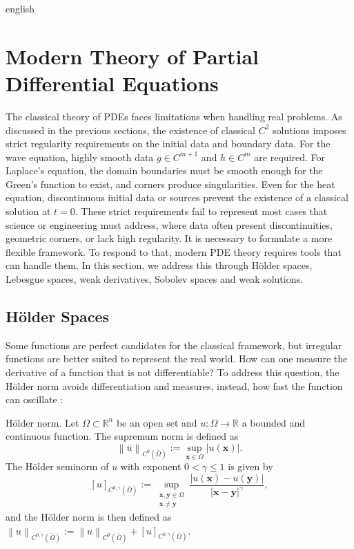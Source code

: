 \documentclass[11pt,letterpaper,twoside,openright]{book} %
\newcommand{\norm}[1]{\left\lVert #1 \right\rVert}
\newcommand{\abs}[1]{\left\lvert #1 \right\rvert}
\begin{document}
\begin{hyphenrules}{english}
\section{Modern Theory of Partial Differential Equations}\label{sec:modern-theory}

The classical theory of PDEs faces limitations when handling real problems. As discussed in the
previous sections, the existence of classical $C^2$ solutions imposes strict regularity requirements on
the initial data and boundary data. For the wave equation, highly smooth data $g\in C^{m+1}$ and
$h\in C^m$ are required. For Laplace's equation, the domain boundaries must be smooth enough for the
Green's function to exist, and corners produce singularities. Even for the heat equation, discontinuous
initial data or sources prevent the existence of a classical solution at $t=0$. These strict
requirements fail to represent most cases that science or engineering must address, where data often
present discontinuities, geometric corners, or lack high regularity. It is necessary to formulate a more
flexible framework. To respond to that, modern PDE theory requires tools that can handle them. In this
section, we address this through Hölder spaces, Lebesgue spaces, weak derivatives, Sobolev spaces and
weak solutions.

\subsection{Hölder Spaces}\label{subsec:holder}

Some functions are perfect candidates for the classical framework, but irregular functions are better
suited to represent the real world. How can one measure the derivative of a function that is not
differentiable? To address this question, the Hölder norm avoids differentiation and measures, instead,
how fast the function can oscillate \cite{evans2010}:

\begin{definicion}{Hölder norm.}\label{def:holder-norm}
Let $\Omega\subset\mathbb{R}^n$ be an open set and $u:\Omega\to\mathbb{R}$ a bounded and continuous function. The
supremum norm is defined as
\[
  \norm{u}_{C^0(\bar\Omega)}:=\sup_{\mathbf{x}\in\Omega}\abs{u(\mathbf{x})}.
\]
The Hölder seminorm of $u$ with exponent $0<\gamma\le1$ is given by
\[
  [u]_{C^{0,\gamma}(\bar\Omega)}:=\sup_{\substack{\mathbf{x},\mathbf{y}\in\Omega\\ \mathbf{x}\neq\mathbf{y}}}
  \frac{\abs{u(\mathbf{x})-u(\mathbf{y})}}{\abs{\mathbf{x}-\mathbf{y}}^{\gamma}},
\]
and the Hölder norm is then defined as
$\norm{u}_{C^{0,\gamma}(\bar\Omega)}:=\norm{u}_{C^0(\bar\Omega)}+[u]_{C^{0,\gamma}(\bar\Omega)}$.
\end{definicion}


\end{hyphenrules}
\end{document}
